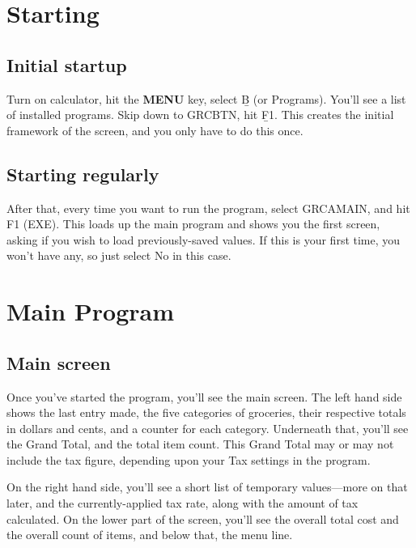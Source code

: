 \documentclass[]{article}
\begin{document}

\section{Starting}
\subsection{Initial startup}
Turn on calculator, hit the {\bf MENU } key, select {\b B } (or Programs). You'll see a list of
installed programs. Skip down to GRCBTN, hit \b F1. This creates the initial framework of the screen,
and you only have to do this once.

\subsection{Starting regularly}
After that, every time you want to run the program, select GRCAMAIN, and hit F1 (EXE).
This loads up the main program and shows you the first screen, asking if you wish to
load previously-saved values. If this is your first time, you won't have any, so just
select No in this case. 


\section{Main Program}
\subsection{Main screen}
Once you've started the program, you'll see the main screen. The left hand side
shows the last entry made, the five categories of groceries, their respective totals
in dollars and cents, and a counter for each category. Underneath that, you'll see the
Grand Total, and the total item count. This Grand Total may or may not include the tax
figure, depending upon your Tax settings in the program.

On the right hand side, you'll see a short list of temporary values---more on that later,
and the currently-applied tax rate, along with the amount of tax calculated. On the lower part of
the screen, you'll see the overall total cost and the overall count of items, and below that, the menu line.
\end{document}
